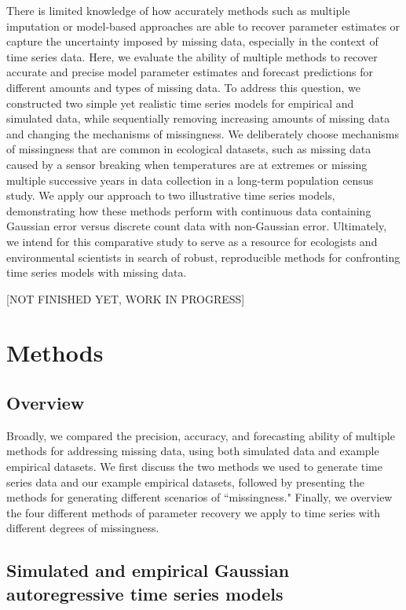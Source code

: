 \documentclass{article}
\begin{document}
There is limited knowledge of how accurately methods such as multiple imputation or model-based approaches are able to recover parameter estimates or capture the uncertainty imposed by missing data, especially in the context of time series data. Here, we evaluate the ability of multiple methods to recover accurate and precise model parameter estimates and forecast predictions for different amounts and types of missing data. To address this question, we constructed two simple yet realistic time series models for empirical and simulated data, while sequentially removing increasing amounts of missing data and changing the mechanisms of missingness. We deliberately choose mechanisms of missingness that are common in ecological datasets, such as missing data caused by a sensor breaking when temperatures are at extremes or missing multiple successive years in data collection in a long-term population census study. We apply our approach to two illustrative time series models, demonstrating how these methods perform with continuous data containing Gaussian error versus discrete count data with non-Gaussian error. Ultimately, we intend for this comparative study to serve as a resource for ecologists and environmental scientists in search of robust, reproducible methods for confronting time series models with missing data.

[NOT FINISHED YET, WORK IN PROGRESS]

\section*{Methods} 

\subsection*{Overview}

Broadly, we compared the precision, accuracy, and forecasting ability of multiple methods for addressing missing data, using both simulated data and example empirical datasets. We first discuss the two methods we used to generate time series data and our example empirical datasets, followed by presenting the methods for generating different scenarios of ``missingness." Finally, we overview the four different methods of parameter recovery we apply to time series with different degrees of missingness. 

\subsection*{Simulated and empirical Gaussian autoregressive time series models}
\end{document}
